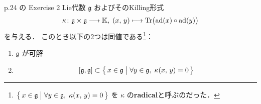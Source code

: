 \documentclass{ltjsarticle}
\theoremstyle{mystyle} %
\numberwithin{equation}{section}
\newcommand{\lto}{\longrightarrow}
\newcommand{\lmto}{\longmapsto}
\begin{document}
\begin{myproblem}[label=ex:2-2-2]{p.24 の Exercise 2}
    Lie代数 $\mathfrak{g}$ およびそのKilling形式
    \begin{align}
        \kappa \colon \mathfrak{g} \times \mathfrak{g} \lto \mathbb{K},\; (x,\, y) \lmto \Tr \bigl(\ad (x) \circ \ad (y)\bigr)
    \end{align}
    を与える．
    このとき以下の2つは同値である\footnote{$\bigl\{\, x \in \mathfrak{g} \bigm| \forall y \in \mathfrak{g},\; \kappa (x,\, y) = 0 \,\bigr\} $  を $\kappa$ の\textbf{radical}と呼ぶのだった．}：
    \begin{enumerate}
        \item $\mathfrak{g}$ が可解
        \item \begin{align}
            \comm{\mathfrak{g}}{\mathfrak{g}} \subset \bigl\{\, x \in \mathfrak{g} \bigm| \forall y \in \mathfrak{g},\; \kappa (x,\, y) = 0 \,\bigr\} 
        \end{align}
    \end{enumerate}
\end{myproblem}
\end{document}
